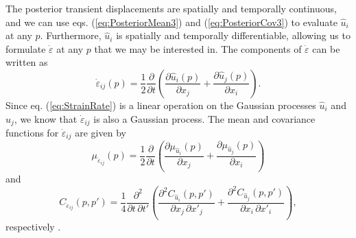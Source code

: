 \documentclass[extra,mreferee]{gji}
\begin{document}
The posterior transient displacements are spatially and temporally continuous, and we can use eqs. (\ref{eq:PosteriorMean3}) and (\ref{eq:PosteriorCov3}) to evaluate $\hat{u}_i$ at any $p$. Furthermore, $\hat{u}_i$ is spatially and temporally differentiable, allowing us to formulate $\dot\varepsilon$ at any $p$ that we may be interested in. The components of $\dot\varepsilon$ can be written as 
\begin{equation}\label{eq:StrainRate}
\dot\varepsilon_{ij}(p) = \frac{1}{2} \frac{\partial}{\partial t} \left(
                                        \frac{\partial \hat{u}_i(p)}{\partial x_j} +  
                                        \frac{\partial \hat{u}_j(p)}{\partial x_i}\right).
\end{equation}
Since eq. (\ref{eq:StrainRate}) is a linear operation on the Gaussian processes $\hat{u}_i$ and $\hat{u}_j$, we know that $\dot\varepsilon_{ij}$ is also a Gaussian process. The mean and covariance functions for $\dot{\varepsilon}_{ij}$ are given by
\begin{equation}\label{eq:StrainMean}
\mu_{\dot\varepsilon_{ij}}(p) = \frac{1}{2}\frac{\partial}{\partial t}\left(
                                  \frac{\partial \mu_{\hat{u}_i}(p)}{\partial x_j} + 
                                  \frac{\partial \mu_{\hat{u}_j}(p)}{\partial x_i} \right)
\end{equation} 
and
\begin{equation}\label{eq:StrainCov}
C_{\dot\varepsilon_{ij}}(p,p') = \frac{1}{4} \frac{\partial^2}{\partial t \, \partial t'}\left(
                                   \frac{\partial^2 C_{\hat{u}_i}(p,p')}{\partial x_j \, \partial x'_j} + 
                                   \frac{\partial^2 C_{\hat{u}_j}(p,p')}{\partial x_i \, \partial x'_i} \right),
\end{equation} 
respectively \citep[sec. 10]{Papoulis1991}.
\end{document}
